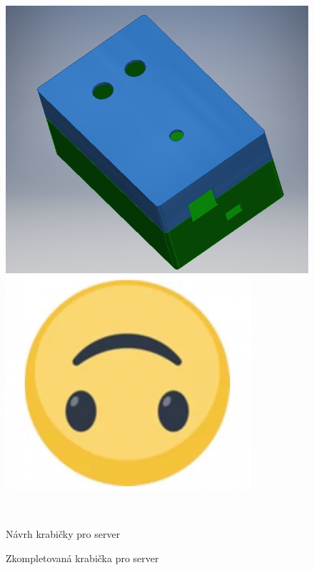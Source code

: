 \begin{figure}[hbtp]
\centering
\begin{minipage}[c]{\textwidth/2-1cm}
\includegraphics[width=\textwidth]{img/foto/server_navrh.png}
\end{minipage}
\begin{minipage}[c]{\textwidth/2-1cm}
\includegraphics[width=\textwidth]{img/foto/server_realizace.png}
\end{minipage}
\\
\begin{minipage}[c]{\textwidth/2-0.5cm}
\caption{\label{fig:server_navrh}Návrh krabičky pro server}
\end{minipage}
\begin{minipage}[c]{\textwidth/2-.5cm}
\caption{\label{fig:server_realizace}Zkompletovaná krabička pro server}
\end{minipage}
\end{figure}


